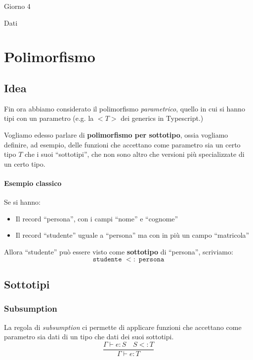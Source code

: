 \documentclass[a4paper,10pt]{article}
\begin{document}
\begin{center}
    \LARGE Giorno 4\smallskip

    \Large Dati
\end{center}\smallskip
\begin{abstract}
 
\end{abstract}

\section{Polimorfismo}
\subsection{Idea}
Fin ora abbiamo considerato il polimorfismo \emph{parametrico}, quello in cui si hanno tipi con un parametro (e.g. la $<T>$ dei generics in Typescript.)\smallskip

Vogliamo edesso parlare di \textbf{polimorfismo per sottotipo}, ossia vogliamo definire, ad esempio, delle funzioni che accettano come parametro sia un certo tipo $T$ che i suoi ``sottotipi'', che non sono altro che versioni più specializzate di un certo tipo. 

\paragraph{Esempio classico} Se si hanno:

\begin{itemize}
 \item Il record ``persona'', con i campi ``nome'' e ``cognome''
 \item Il record ``studente'' uguale a ``persona'' ma con in più un campo ``matricola''
\end{itemize}
Allora ``studente'' può essere visto come \textbf{sottotipo} di ``persona'', scriviamo:
\[ \texttt{studente } <: \texttt{ persona} \]

\subsection{Sottotipi}
\subsubsection{Subsumption}
La regola di \emph{subsumption} ci permette di applicare funzioni che accettano come parametro sia dati di un tipo che dati dei suoi sottotipi.
\[ \dfrac{\Gamma \vdash e : S \quad S <: T}{\Gamma \vdash e :T} \]
\end{document}
